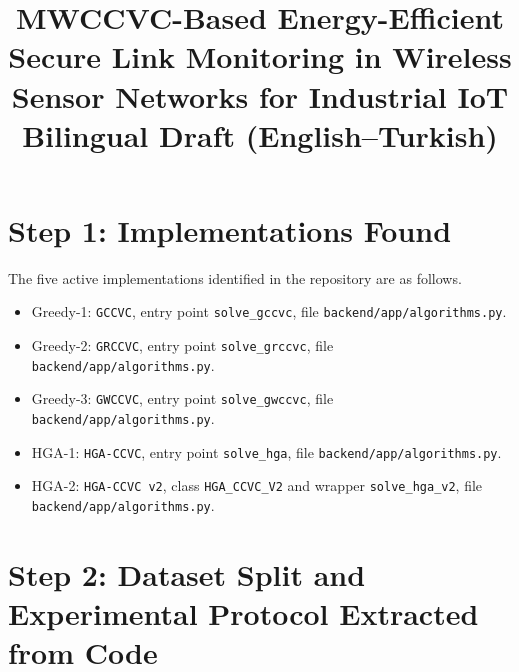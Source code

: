 \documentclass[11pt]{article}
\title{MWCCVC-Based Energy-Efficient Secure Link Monitoring in Wireless Sensor Networks for Industrial IoT\\Bilingual Draft (English--Turkish)}
\author{}
\date{}
\begin{document}
\maketitle
\tableofcontents
\clearpage


\section*{Step 1: Implementations Found}

The five active implementations identified in the repository are as follows.

\begin{itemize}
    \item Greedy-1: \texttt{GCCVC}, entry point \texttt{solve\_gccvc}, file \texttt{backend/app/algorithms.py}.
    \item Greedy-2: \texttt{GRCCVC}, entry point \texttt{solve\_grccvc}, file \texttt{backend/app/algorithms.py}.
    \item Greedy-3: \texttt{GWCCVC}, entry point \texttt{solve\_gwccvc}, file \texttt{backend/app/algorithms.py}.
    \item HGA-1: \texttt{HGA-CCVC}, entry point \texttt{solve\_hga}, file \texttt{backend/app/algorithms.py}.
    \item HGA-2: \texttt{HGA-CCVC v2}, class \texttt{HGA\_CCVC\_V2} and wrapper \texttt{solve\_hga\_v2}, file \texttt{backend/app/algorithms.py}.
\end{itemize}

\section*{Step 2: Dataset Split and Experimental Protocol Extracted from Code}
\end{document}
